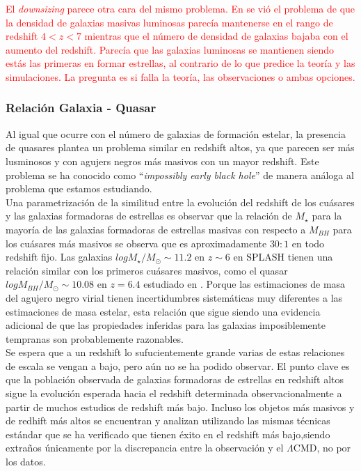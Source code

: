 \documentclass{article}
\begin{document}
\textcolor{red}{El \textit{downsizing} parece otra cara del mismo problema. En \citep{arranz2015finkelstein} se vió el problema de que la densidad de galaxias masivas luminosas parecía mantenerse en el rango de redshift $4<z<7$ mientras que el número de densidad de galaxias bajaba con el aumento del redshift. Parecía que las galaxias luminosas se mantienen siendo estás las primeras en formar estrellas, al contrario de lo que predice la teoría y las simulaciones. La pregunta es si falla la teoría, las observaciones o ambas opciones.}

\subsubsection*{Relación Galaxia - Quasar}

Al igual que ocurre con el número de galaxias de formación estelar, la presencia de quasares plantea un problema similar en redshift altos, ya que parecen ser más lusminosos y con agujers negros más masivos con un mayor redshift. Este problema se ha conocido como ``\textit{impossibly early black hole}'' de manera análoga al problema que estamos estudiando.\\

Una parametrización de la similitud entre la evolución del redshift de los cuásares y las galaxias formadoras de estrellas es observar que la relación de $M_\star$ para la mayoría de las galaxias formadoras de estrellas masivas con respecto a $M_{BH}$ para los cuásares más masivos se observa que es aproximadamente $30:1$ en todo redshift fijo. Las galaxias $log M_\star / M_\odot\sim11.2$ en $z\sim 6$ en SPLASH tienen una relación similar con los primeros cuásares masivos, como el quasar $log M_{BH} / M_\odot\sim 10.08$  en $z = 6.4$ estudiado en \cite{wu2015ultraluminous}. Porque las estimaciones de masa del agujero negro virial tienen incertidumbres sistemáticas muy diferentes a las estimaciones de masa estelar, esta relación que sigue siendo una evidencia adicional de que las propiedades inferidas para las galaxias imposiblemente tempranas son probablemente razonables.\\

Se espera que a un redshift lo sufucientemente grande varias de estas relaciones de escala se vengan a bajo, pero aún no se ha podido observar. El punto clave es que la población observada de galaxias formadoras de estrellas  en redshift altos  sigue la evolución esperada hacia el redshift determinada observacionalmente a partir de muchos estudios de redshift más bajo. Incluso los objetos más masivos y de redhift más altos se encuentran y analizan utilizando las mismas técnicas estándar que se ha verificado que tienen éxito en el redshift más bajo,siendo extraños únicamente por la discrepancia entre la observación y el $\Lambda$CMD, no por los datos.\\
\end{document}
